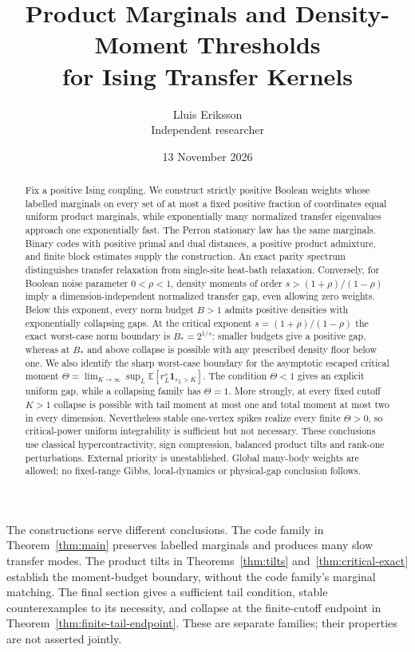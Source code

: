 \documentclass[11pt]{article}
\title{Product Marginals and Density-Moment Thresholds\\for Ising Transfer Kernels}
\author{Lluis Eriksson\\\small Independent researcher}
\date{13 November 2026}
\begin{document}
\maketitle
\begin{abstract}
Fix a positive Ising coupling. We construct strictly positive Boolean
weights whose labelled marginals on every set of at most a fixed positive
fraction of coordinates equal uniform product marginals, while exponentially
many normalized transfer eigenvalues approach one exponentially fast.
The Perron stationary law has the same marginals. Binary codes with positive
primal and dual distances, a positive product admixture, and finite block
estimates supply the construction. An exact parity spectrum distinguishes
transfer relaxation from single-site heat-bath relaxation.
Conversely, for Boolean noise parameter $0<\rho<1$, density moments of order
$s>(1+\rho)/(1-\rho)$ imply a dimension-independent normalized transfer gap,
even allowing zero weights. Below this exponent, every norm budget $B>1$
admits positive densities with exponentially collapsing gaps.
At the critical exponent $s=(1+\rho)/(1-\rho)$ the exact worst-case norm
boundary is $B_*=2^{1/s}$: smaller budgets give a positive gap, whereas
at $B_*$ and above collapse is possible with any prescribed density floor
below one. We also identify the sharp worst-case boundary for the
asymptotic escaped critical moment
$\Theta=\lim_{K\to\infty}\sup_L\mathbb E[r_L^s\mathbf1_{r_L>K}]$.
The condition $\Theta<1$ gives an explicit uniform gap, while a collapsing
family has $\Theta=1$. More strongly, at every fixed cutoff $K>1$
collapse is possible with tail moment at most one and total moment at most
two in every dimension. Nevertheless stable one-vertex spikes realize every
finite $\Theta>0$, so critical-power uniform integrability is sufficient
but not necessary. These conclusions use classical hypercontractivity,
sign compression, balanced product tilts and rank-one perturbations.
External priority is unestablished. Global many-body weights are allowed;
no fixed-range Gibbs, local-dynamics or physical-gap conclusion follows.
\end{abstract}


The constructions serve different conclusions. The code family in
Theorem~\ref{thm:main} preserves labelled marginals and produces many slow
transfer modes. The product tilts in Theorems~\ref{thm:tilts}
and~\ref{thm:critical-exact} establish the moment-budget boundary, without
the code family's marginal matching. The final section gives a sufficient
tail condition, stable counterexamples to its necessity, and collapse at
the finite-cutoff endpoint in Theorem~\ref{thm:finite-tail-endpoint}.
These are separate families; their properties are not asserted jointly.
\end{document}
